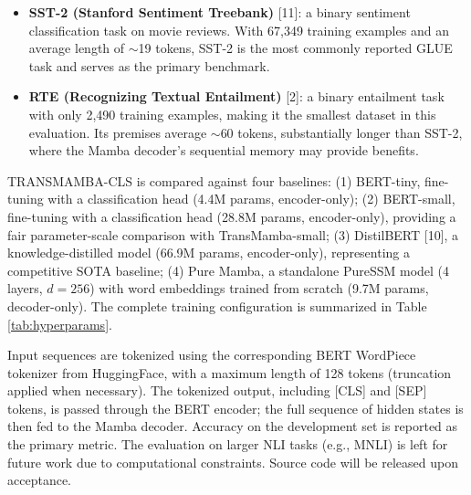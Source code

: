 \documentclass[runningheads]{llncs}
\begin{document}
\begin{itemize}
    \item \textbf{SST-2 (Stanford Sentiment Treebank)} [11]: a binary sentiment classification task on movie reviews. With 67,349 training examples and an average length of $\sim$19 tokens, SST-2 is the most commonly reported GLUE task and serves as the primary benchmark.
    \item \textbf{RTE (Recognizing Textual Entailment)} [2]: a binary entailment task with only 2,490 training examples, making it the smallest dataset in this evaluation. Its premises average $\sim$60 tokens, substantially longer than SST-2, where the Mamba decoder's sequential memory may provide benefits.
\end{itemize}

TRANSMAMBA-CLS is compared against four baselines: (1) BERT-tiny, fine-tuning with a classification head (4.4M params, encoder-only); (2) BERT-small, fine-tuning with a classification head (28.8M params, encoder-only), providing a fair parameter-scale comparison with TransMamba-small; (3) DistilBERT [10], a knowledge-distilled model (66.9M params, encoder-only), representing a competitive SOTA baseline; (4) Pure Mamba, a standalone PureSSM model (4 layers, $d=256$) with word embeddings trained from scratch (9.7M params, decoder-only). The complete training configuration is summarized in Table \ref{tab:hyperparams}.

Input sequences are tokenized using the corresponding BERT WordPiece tokenizer from HuggingFace, with a maximum length of 128 tokens (truncation applied when necessary). The tokenized output, including [CLS] and [SEP] tokens, is passed through the BERT encoder; the full sequence of hidden states is then fed to the Mamba decoder. Accuracy on the development set is reported as the primary metric. The evaluation on larger NLI tasks (e.g., MNLI) is left for future work due to computational constraints. Source code will be released upon acceptance.
\end{document}

